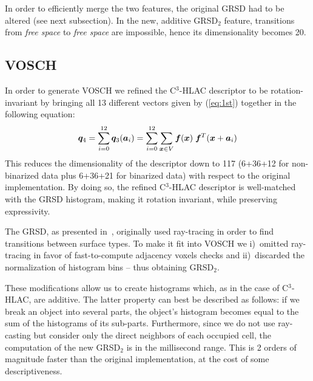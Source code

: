 \documentclass[a4paper, 10 pt, conference]{sty/ieeeconf}
\begin{document}
In order to efficiently merge the two features, the original GRSD had to be altered (see next subsection). 
In the new, additive GRSD$_2$ feature, transitions from \emph{free space} to \emph{free space} are impossible,
hence its dimensionality becomes 20.

\subsection{VOSCH}
\label{sec:VOSCH}
In order to generate VOSCH we refined the C$^3$-HLAC descriptor to be rotation-invariant by bringing all  
13 different vectors given by (\ref{eq:1st}) together in the following equation: 
\begin{equation}\label{eq:1st_new}
  {\bm q_4} = \sum_{i=0}^{12} {\bm q_3}({\bm a}_i) = \sum_{i=0}^{12}\sum_{{\bm x} \in V} \bm{f}({\bm x}) \hspace{1mm}\bm{f}^T({\bm x}+{\bm a_i}) \\
\end{equation}
%
This reduces the dimensionality of the descriptor down to 117 (6+36+12 for non-binarized data plus 6+36+21 
for binarized data) with respect to the original implementation. 
By doing so, the refined C$^3$-HLAC descriptor is well-matched with the GRSD histogram,
making it rotation invariant, while preserving expressivity.

The GRSD, as presented in~\cite{GRSD10Humanoids}, originally used
ray-tracing in order to find transitions between surface types. To make it fit into VOSCH 
we i)~omitted ray-tracing in favor of fast-to-compute adjacency voxels checks and ii)~discarded
the normalization of histogram bins -- thus obtaining GRSD$_2$.

These modifications allow us to create histograms which, as in the case of C$^3$-HLAC, are additive.
The latter property can best be described as follows: 
if we break an object into several parts, 
the object's histogram becomes equal to the sum of the histograms of its sub-parts. 
%
%
 Furthermore, since we do not use ray-casting but 
consider only the direct neighbors of each occupied cell, the computation of the new GRSD$_2$ is in 
the millisecond range. This is 2 orders of magnitude faster than the original implementation,
at the cost of some descriptiveness.
\end{document}
